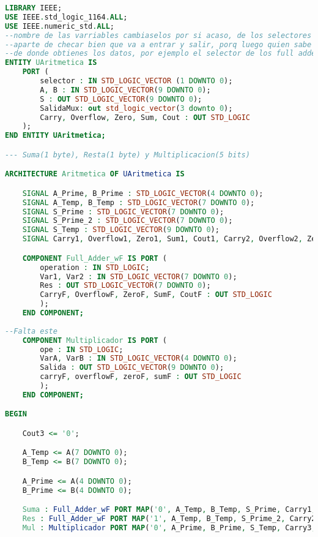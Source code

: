 \begin{lstlisting}[language={vhdl}, caption={Unidad Aritmetica}, label={Script}]
LIBRARY IEEE;
USE IEEE.std_logic_1164.ALL;
USE IEEE.numeric_std.ALL;
--nombre de las varriables cambiaselos por si acaso, de los selectores
--aparte de checar bien que va a entrar y salir, porq luego quien sabe
--de donde obtienes los datos, por ejemplo el selector de los full adders
ENTITY UAritmetica IS
	PORT (
		selector : IN STD_LOGIC_VECTOR (1 DOWNTO 0);
		A, B : IN STD_LOGIC_VECTOR(9 DOWNTO 0);
		S : OUT STD_LOGIC_VECTOR(9 DOWNTO 0);
		SalidaMux: out std_logic_vector(3 downto 0);
		Carry, Overflow, Zero, Sum, Cout : OUT STD_LOGIC
	);
END ENTITY UAritmetica;

--- Suma(1 byte), Resta(1 byte) y Multiplicacion(5 bits)

ARCHITECTURE Aritmetica OF UAritmetica IS

	SIGNAL A_Prime, B_Prime : STD_LOGIC_VECTOR(4 DOWNTO 0);
	SIGNAL A_Temp, B_Temp : STD_LOGIC_VECTOR(7 DOWNTO 0);
	SIGNAL S_Prime : STD_LOGIC_VECTOR(7 DOWNTO 0);
	SIGNAL S_Prime_2 : STD_LOGIC_VECTOR(7 DOWNTO 0);
	SIGNAL S_Temp : STD_LOGIC_VECTOR(9 DOWNTO 0);
	SIGNAL Carry1, Overflow1, Zero1, Sum1, Cout1, Carry2, Overflow2, Zero2, Sum2, Cout2, Carry3, Overflow3, Zero3, Sum3, Cout3 : STD_LOGIC;

	COMPONENT Full_Adder_wF IS PORT (
		operation : IN STD_LOGIC;
		Var1, Var2 : IN STD_LOGIC_VECTOR(7 DOWNTO 0);
		Res : OUT STD_LOGIC_VECTOR(7 DOWNTO 0);
		CarryF, OverflowF, ZeroF, SumF, CoutF : OUT STD_LOGIC
		);
	END COMPONENT;
	
--Falta este
	COMPONENT Multiplicador IS PORT (
		ope : IN STD_LOGIC;
		VarA, VarB : IN STD_LOGIC_VECTOR(4 DOWNTO 0);
		Salida : OUT STD_LOGIC_VECTOR(9 DOWNTO 0);
		carryF, overflowF, zeroF, sumF : OUT STD_LOGIC
		);
	END COMPONENT;

BEGIN

	Cout3 <= '0';

	A_Temp <= A(7 DOWNTO 0);
	B_Temp <= B(7 DOWNTO 0);

	A_Prime <= A(4 DOWNTO 0);
	B_Prime <= B(4 DOWNTO 0);

	Suma : Full_Adder_wF PORT MAP('0', A_Temp, B_Temp, S_Prime, Carry1, Overflow1, Zero1, Sum1, Cout1);
	Res : Full_Adder_wF PORT MAP('1', A_Temp, B_Temp, S_Prime_2, Carry2, Overflow2, Zero2, Sum2, Cout2);
	Mul : Multiplicador PORT MAP('0', A_Prime, B_Prime, S_Temp, Carry3, Overflow3, Zero3, Sum3);


\end{lstlisting}

